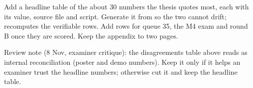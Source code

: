 \begin{instructions}
Add a headline table of the about 30 numbers the thesis quotes most, each with its value, source file and script.
Generate it from  so the two cannot drift; 
recomputes the verifiable rows. Add rows for queue 35, the M4 exam and round B once they are scored. Keep the appendix
to two pages.

Review note (8 Nov, examiner critique): the disagreements table above reads as internal reconciliation (poster and demo
numbers). Keep it only if it helps an examiner trust the headline numbers; otherwise cut it and keep the headline
table.
\end{instructions}

